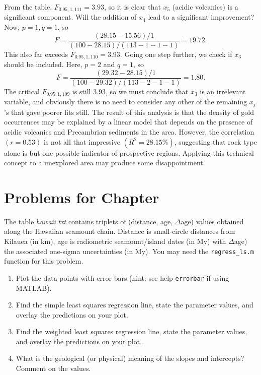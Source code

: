 \begin{example}
From the table, $F_{0.95,1,111} = 3.93$, so it is clear that $x_5$ (acidic volcanics) is a significant component.  Will the 
addition of $x_4$ lead to a significant improvement?  Now, $p = 1, q = 1$, so 
\begin{equation}
F = \frac{(28.15 - 15.56)/1}{(100 - 28.15)/(113 - 1 -1 -1 )} = 19.72.
\end{equation}
This also far exceeds $F_{0.95,1,110} = 3.93$.  Going one step further, we check if $x_3$ should be 
included.  Here, $p = 2$ and $q = 1$, so
\begin{equation}
F = \frac{(29.32 - 28.15)/1}{(100 - 29.32)/(113 - 2 - 1 -1 )} = 1.80.
\end{equation}	 
The critical $F_{0.95,1,109}$ is still 3.93, so we must conclude that $x_3$ is an irrelevant variable, and 
obviously there is no need to consider any other of the remaining $x_j$'s that gave poorer fits still.  The result of this analysis 
is that the density of gold occurrences may be explained by a linear model that depends on the 
presence of acidic volcanics and Precambrian sediments in the area.  
However, the correlation $(r = 0.53)$ is not all that impressive $(R^2 = 28.15\%)$, suggesting that rock type 
alone is but one possible indicator of prospective regions.  Applying this technical concept to a
unexplored area may produce some disappointment.
\end{example}

\clearpage
\section{Problems for Chapter \thechapter}

\begin{problem}
The table \emph{hawaii.txt} contains triplets of (distance, age, $\Delta$age) values
obtained along the Hawaiian seamount chain.  Distance is small-circle distances from Kilauea (in km),
age is radiometric seamount/island dates (in My) with $\Delta$age) the associated one-sigma uncertainties (in My).
You may need the \texttt{regress\_ls.m} function for this problem.
\begin{enumerate}[label=\alph*)]
\item  Plot the data points with error bars (hint: see help \texttt{errorbar} if using MATLAB).
\item  Find the simple least squares regression line, state the parameter values, and overlay the predictions on your plot.
\item  Find the weighted least squares regression line, state the parameter values, and overlay the predictions on your plot.
\item What is the geological (or physical) meaning of the slopes and intercepts?  Comment on the values.
\end{enumerate}
\end{problem}

